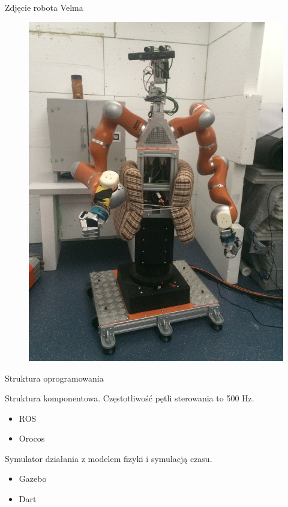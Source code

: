 \documentclass{beamer}
\begin{document}
\begin{frame}{Zdjęcie robota Velma}
\begin{figure}[h]
	\centering
	\includegraphics[scale=0.06, angle =-90]{velma1}
\end{figure}

\end{frame}

\begin{frame}{Struktura oprogramowania}

Struktura komponentowa. Częstotliwość pętli sterowania to 500 Hz.

\begin{itemize}
	\item ROS
	\item Orocos
\end{itemize}

Symulator działania z modelem fizyki i symulacją czasu.


\begin{itemize}
	\item Gazebo
	\item Dart
\end{itemize}
\end{frame}
\end{document}
